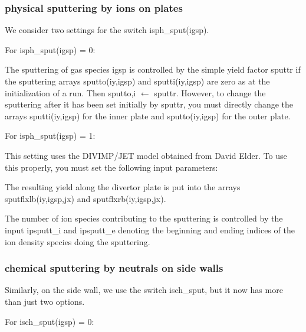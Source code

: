 \documentclass [12pt]{article}
\def\hsa{\hskip.4truein}
\def\hsp6{\hskip.6truein}
\begin{document}
\subsubsection{physical sputtering by ions on plates}

We consider two settings for the switch {\sf isph\_sput(igsp)}.

\noindent
For {\sf isph\_sput(igsp)} = 0:

The sputtering of gas species igsp is controlled by the simple yield factor
{\sf sputtr} if the sputtering arrays {\sf sputto(iy,igsp)} and {\sf
  sputti(iy,igsp)} are zero as at the initialization of a run.  Then {\sf
  sputto,i $\leftarrow$ sputtr}.  However, to change the sputtering after it
has been set initially by {\sf sputtr}, you must directly change the arrays
{\sf sputti(iy,igsp)} for the inner plate and {\sf sputto(iy,igsp)} for the
outer plate.

\noindent
For {\sf isph\_sput(igsp)} = 1:

     This setting uses the DIVIMP/JET model obtained from David Elder.  To use
this properly, you must set the following input parameters:
{\sf
{}
}
The resulting yield along the divertor plate is put into the arrays
{\sf sputflxlb(iy,igsp,jx)} and {\sf sputflxrb(iy,igsp,jx)}.

The number of ion species contributing to the sputtering is controlled by the
input {\sf ipsputt\_i} and {\sf ipsputt\_e} denoting the beginning and ending 
indices of the ion density species doing the sputtering.

\subsubsection{chemical sputtering by neutrals on side walls}
Similarly, on the side wall, we use the switch {\sf isch\_sput}, but it now
has more than just two options.

\noindent
For {\sf isch\_sput(igsp)} = 0:
\end{document}
